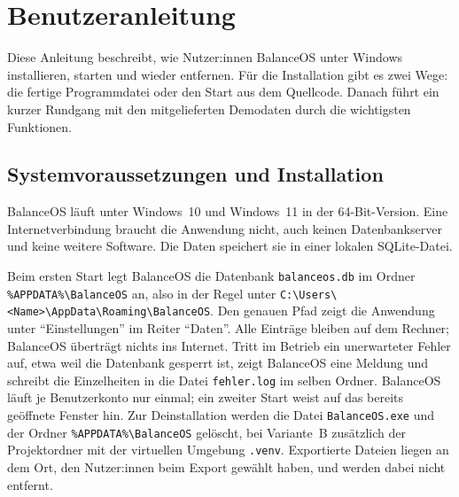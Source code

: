 \section{Benutzeranleitung}
Diese Anleitung beschreibt, wie Nutzer:innen BalanceOS unter Windows installieren, starten und wieder entfernen. Für die Installation gibt es zwei Wege: die fertige Programmdatei oder den Start aus dem Quellcode. Danach führt ein kurzer Rundgang mit den mitgelieferten Demodaten durch die wichtigsten Funktionen.

\subsection{Systemvoraussetzungen und Installation}
BalanceOS läuft unter Windows~10 und Windows~11 in der 64-Bit-Version. Eine Internetverbindung braucht die Anwendung nicht, auch keinen Datenbankserver und keine weitere Software. Die Daten speichert sie in einer lokalen SQLite-Datei.

Beim ersten Start legt BalanceOS die Datenbank \texttt{balanceos.db} im Ordner \texttt{\%APPDATA\%\textbackslash BalanceOS} an, also in der Regel unter \texttt{C:\textbackslash Users\textbackslash <Name>\textbackslash AppData\textbackslash Roaming\textbackslash BalanceOS}. Den genauen Pfad zeigt die Anwendung unter \enquote{Einstellungen} im Reiter \enquote{Daten}. Alle Einträge bleiben auf dem Rechner; BalanceOS überträgt nichts ins Internet. Tritt im Betrieb ein unerwarteter Fehler auf, etwa weil die Datenbank gesperrt ist, zeigt BalanceOS eine Meldung und schreibt die Einzelheiten in die Datei \texttt{fehler.log} im selben Ordner. BalanceOS läuft je Benutzerkonto nur einmal; ein zweiter Start weist auf das bereits geöffnete Fenster hin. Zur Deinstallation werden die Datei \texttt{BalanceOS.exe} und der Ordner \texttt{\%APPDATA\%\textbackslash BalanceOS} gelöscht, bei Variante~B zusätzlich der Projektordner mit der virtuellen Umgebung \texttt{.venv}. Exportierte Dateien liegen an dem Ort, den Nutzer:innen beim Export gewählt haben, und werden dabei nicht entfernt.

